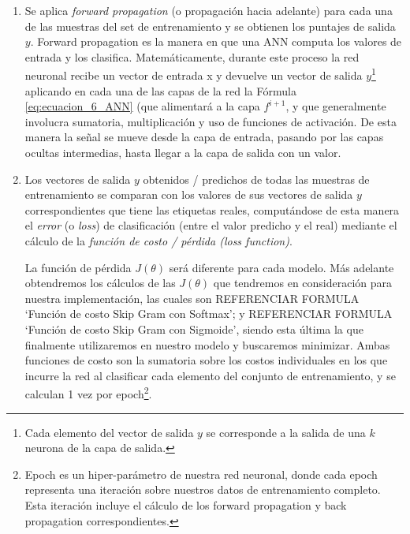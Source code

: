 \documentclass[12pt,a4paper]{article}
\begin{document}
\begin{sloppypar}
\begin{enumerate}
\item Se aplica \textit{forward propagation} (o propagación hacia adelante) para cada una de las muestras del set de entrenamiento y se obtienen los puntajes de salida $y$. Forward propagation es la manera en que una ANN computa los valores de entrada y los clasifica. Matemáticamente, durante este proceso la red neuronal recibe un vector de entrada x y devuelve un vector de salida $y$\footnote{Cada elemento del vector de salida $y$ se corresponde a la salida de una $k$ neurona de la capa de salida.} aplicando en cada una de las capas de la red la Fórmula \ref{eq:ecuacion_6_ANN} (que alimentará a la capa $f^{i+1}$, y que generalmente involucra sumatoria, multiplicación y uso de funciones de activación. De esta manera la señal se mueve desde la capa de entrada, pasando por las capas ocultas intermedias, hasta llegar a la capa de salida con un valor.

\item Los vectores de salida $y$ obtenidos / predichos de todas las muestras de entrenamiento se comparan con los valores de sus vectores de salida $y$ correspondientes que tiene las etiquetas reales, computándose de esta manera el \textit{error} (o \textit{loss}) de clasificación (entre el valor predicho y el real) mediante el cálculo de la \textit{función de costo / pérdida (loss function)}.

La función de pérdida  $J(\theta)$ será diferente para cada modelo. Más adelante obtendremos los cálculos de las $J(\theta)$ que tendremos en consideración para nuestra implementación, las cuales son REFERENCIAR FORMULA ‘Función de costo Skip Gram con Softmax’;  y REFERENCIAR FORMULA ‘Función de costo Skip Gram con Sigmoide’, siendo esta última la que finalmente utilizaremos en nuestro modelo y buscaremos minimizar. Ambas funciones de costo son la sumatoria sobre los costos individuales en los que incurre la red al clasificar cada elemento del conjunto de entrenamiento, y se calculan 1 vez por epoch\footnote{Epoch es un hiper-parámetro de nuestra red neuronal, donde cada epoch representa una iteración sobre nuestros datos de entrenamiento completo. Esta iteración incluye el cálculo de los forward propagation y back propagation correspondientes.}.


\end{enumerate}
\end{sloppypar}
\end{document}
